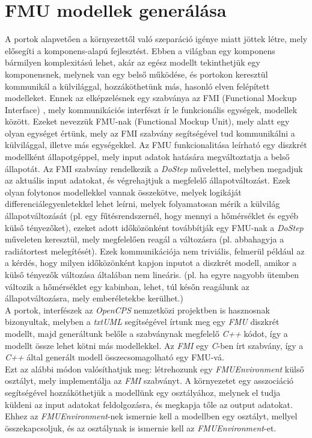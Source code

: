\documentclass[a4paper,12pt]{report}
\begin{document}
\section{FMU modellek generálása}
A portok alapvetően a környezettől való szeparáció igénye miatt jöttek létre, mely elősegíti a komponens-alapú fejlesztést. Ebben a világban egy komponens bármilyen komplexitású lehet, akár az egész modellt tekinthetjük egy komponensnek, melynek van egy belső működése, és portokon keresztül kommunikál a külvilággal, hozzáköthetünk más, hasonló elven felépített modelleket. Ennek az elképzelésnek egy szabványa az FMI (Functional Mockup Interface) \cite{fmi_standard}, mely kommunikációs interfészt ír le funkcionális egységek, modellek között. Ezeket nevezzük FMU-nak (Functional Mockup Unit), mely alatt egy olyan egységet értünk, mely az FMI  szabvány segítségével tud kommunikálni a külvilággal, illetve más egységekkel. Az FMU funkcionalitása leírható egy diszkrét modellként állapotgéppel, mely input adatok hatására megváltoztatja a belső állapotát. Az FMI szabvány rendelkezik a \textit{DoStep} művelettel, melyben megadjuk az aktuális input adatokat, és végrehajtjuk a megfelelő állapotváltozást. Ezek olyan folytonos modellekkel vannak összekötve, melyek logikáját differenciálegyenletekkel lehet leírni, melyek folyamatosan mérik a külvilág állapotváltozását (pl. egy fűtésrendszernél, hogy mennyi a hőmérséklet és egyéb külső tényezőket), ezeket adott időközönként továbbítják egy FMU-nak a \textit{DoStep} műveleten keresztül, mely megfelelően reagál a változásra (pl. abbahagyja a radiátortest melegítését). Ezek kommunikációja nem triviális, felmerül például az a kérdés, hogy milyen időközönként kapjon inputot a diszkrét modell, amikor a külső tényezők változása általában nem lineáris. (pl. ha egyre nagyobb ütemben változik a hőmérséklet egy kabinban, lehet, túl későn reagálunk az állapotváltozásra, mely emberéletekbe kerülhet.) \\ A portok, interfészek az \textit{OpenCPS}\cite{opencps} nemzetközi projektben is hasznosnak bizonyultak, melyben a \textit{txtUML} segítségével írtunk meg egy \textit{FMU} diszkrét modellt, majd generáltunk belőle a szabványnak megfelelő \textit{C++} kódot, így a modellt össze lehet kötni más modellekkel. Az \textit{FMI} egy \textit{C}-ben írt szabvány, így a \textit{C++} által generált modell összecsomagolható egy FMU-vá. \cite{fmu_export} \\
Ezt az alábbi módon valósíthatjuk meg: létrehozunk egy \textit{FMUEnvironment} külső osztályt, mely implementálja az \textit{FMI} szabványt. A környezetet egy asszociáció segítségével hozzáköthetjük a modellünk egy osztályához,  melynek el tudja küldeni az input adatokat feldolgozásra, és megkapja tőle az output adatokat. Ehhez az \textit{FMUEnvironment}-nek ismernie kell a modellben egy osztályt, mellyel összekapcsoljuk, és az osztálynak is ismernie kell az \textit{FMUEnvironment}-et.   \\
\end{document}
